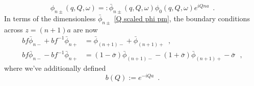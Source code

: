 \begin{equation}
    \label{Q scaled phi pm}
    \phi_{n\pm}(q,Q,\omega) =: \bar\phi_{n\pm}(q,Q,\omega) \phi_0(q,Q,\omega) e^{i Q n a}
    \,\,\,.
\end{equation}
In terms of the dimensionless $\bar\phi_{n\pm}$ \eqref{Q scaled phi pm}, the boundary conditions across $z=(n+1)a$ are now
\begin{align}
    \label{perturbed BC1}
    bf \bar\phi_{n-} + bf^{-1}\bar\phi_{n+} &= \bar\phi_{(n+1)-} + \bar\phi_{(n+1)+}
    \,\,\,,
    \\
    \label{perturbed BC2}
    bf \bar\phi_{n-} - bf^{-1}\bar\phi_{n+} &= (1-\bar\sigma)\bar\phi_{(n+1)-}-(1+\bar\sigma)\bar\phi_{(n+1)+} - \bar\sigma
    \,\,\,\,,
\end{align}
where we've additionally defined
\begin{equation}
    \label{b def}
    b(Q):=e^{-i Q a}
    \,\,\,.
\end{equation}


